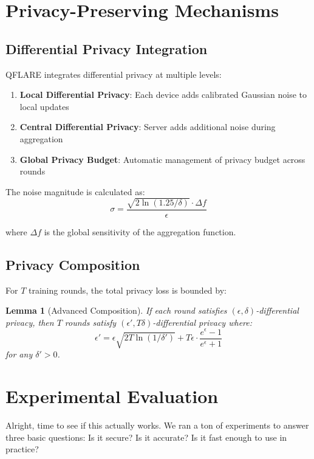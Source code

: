 \documentclass[journal,onecolumn]{IEEEtran}
\newtheorem{lemma}[theorem]{Lemma}
\begin{document}
\section{Privacy-Preserving Mechanisms}

\subsection{Differential Privacy Integration}

QFLARE integrates differential privacy at multiple levels:

\begin{enumerate}
\item \textbf{Local Differential Privacy}: Each device adds calibrated Gaussian noise to local updates
\item \textbf{Central Differential Privacy}: Server adds additional noise during aggregation
\item \textbf{Global Privacy Budget}: Automatic management of privacy budget across rounds
\end{enumerate}

The noise magnitude is calculated as:
$$\sigma = \frac{\sqrt{2\ln(1.25/\delta)} \cdot \Delta f}{\epsilon}$$

where $\Delta f$ is the global sensitivity of the aggregation function.

\subsection{Privacy Composition}

For $T$ training rounds, the total privacy loss is bounded by:

\begin{lemma}[Advanced Composition]
If each round satisfies $(\epsilon, \delta)$-differential privacy, then $T$ rounds satisfy $(\epsilon', T\delta)$-differential privacy where:
$$\epsilon' = \epsilon\sqrt{2T\ln(1/\delta')} + T\epsilon \cdot \frac{e^\epsilon - 1}{e^\epsilon + 1}$$
for any $\delta' > 0$.
\end{lemma}

\section{Experimental Evaluation}
\label{sec:evaluation}

Alright, time to see if this actually works. We ran a ton of experiments to answer three basic questions: Is it secure? Is it accurate? Is it fast enough to use in practice?
\end{document}

